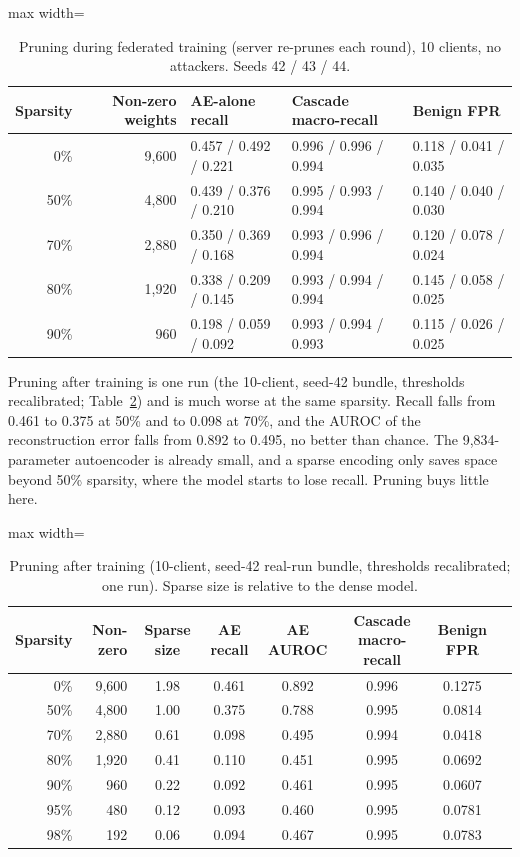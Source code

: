 \begin{table}[t]
\centering
\caption{Pruning during federated training (server re-prunes each round), 10 clients, no attackers. Seeds 42 / 43 / 44.}
\label{tab:prunefl}
\small
\begin{adjustbox}{max width=\linewidth}
\begin{tabular}{rrlll}
\toprule
Sparsity & Non-zero weights & AE-alone recall & Cascade macro-recall & Benign FPR \\
\midrule
0\% & 9,600 & 0.457 / 0.492 / 0.221 & 0.996 / 0.996 / 0.994 & 0.118 / 0.041 / 0.035 \\
50\% & 4,800 & 0.439 / 0.376 / 0.210 & 0.995 / 0.993 / 0.994 & 0.140 / 0.040 / 0.030 \\
70\% & 2,880 & 0.350 / 0.369 / 0.168 & 0.993 / 0.996 / 0.994 & 0.120 / 0.078 / 0.024 \\
80\% & 1,920 & 0.338 / 0.209 / 0.145 & 0.993 / 0.994 / 0.994 & 0.145 / 0.058 / 0.025 \\
90\% & 960 & 0.198 / 0.059 / 0.092 & 0.993 / 0.994 / 0.993 & 0.115 / 0.026 / 0.025 \\
\bottomrule
\end{tabular}
\end{adjustbox}
\end{table}

Pruning after training is one run (the 10-client, seed-42 bundle, thresholds recalibrated; Table~\ref{tab:prunepost}) and is much worse at the same sparsity. Recall falls from 0.461 to 0.375 at 50\% and to 0.098 at 70\%, and the AUROC of the reconstruction error falls from 0.892 to 0.495, no better than chance. The 9,834-parameter autoencoder is already small, and a sparse encoding only saves space beyond 50\% sparsity, where the model starts to lose recall. Pruning buys little here.

\begin{table}[t]
\centering
\caption{Pruning after training (10-client, seed-42 real-run bundle, thresholds recalibrated; one run). Sparse size is relative to the dense model.}
\label{tab:prunepost}
\small
\setlength{\tabcolsep}{3pt}
\begin{adjustbox}{max width=\linewidth}
\begin{tabular}{rrcccccc}
\toprule
Sparsity & Non-zero & Sparse size & AE recall & AE AUROC & Cascade macro-recall & Benign FPR \\
\midrule
0\% & 9,600 & 1.98 & 0.461 & 0.892 & 0.996 & 0.1275 \\
50\% & 4,800 & 1.00 & 0.375 & 0.788 & 0.995 & 0.0814 \\
70\% & 2,880 & 0.61 & 0.098 & 0.495 & 0.994 & 0.0418 \\
80\% & 1,920 & 0.41 & 0.110 & 0.451 & 0.995 & 0.0692 \\
90\% & 960 & 0.22 & 0.092 & 0.461 & 0.995 & 0.0607 \\
95\% & 480 & 0.12 & 0.093 & 0.460 & 0.995 & 0.0781 \\
98\% & 192 & 0.06 & 0.094 & 0.467 & 0.995 & 0.0783 \\
\bottomrule
\end{tabular}
\end{adjustbox}
\end{table}

